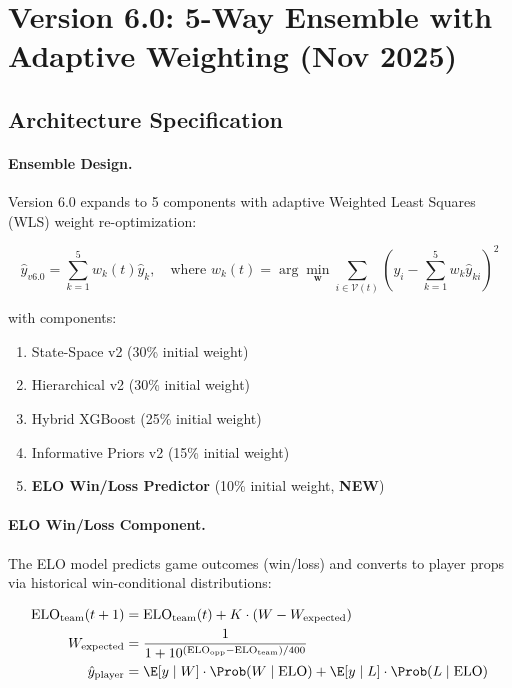 \section{Version 6.0: 5-Way Ensemble with Adaptive Weighting (Nov 2025)}
\label{sec:arch-v6}

\subsection{Architecture Specification}

\paragraph{Ensemble Design.}
Version 6.0 expands to 5 components with adaptive Weighted Least Squares (WLS) weight re-optimization:

\begin{equation}
\label{eq:v6-ensemble}
\hat{y}_{v6.0} = \sum_{k=1}^{5} w_k(t) \hat{y}_k, \quad \text{where } w_k(t) = \arg\min_{\mathbf{w}} \sum_{i \in \mathcal{V}(t)} \left( y_i - \sum_{k=1}^{5} w_k \hat{y}_{ki} \right)^2
\end{equation}

\noindent with components:
\begin{enumerate}[itemsep=2pt,parsep=0pt]
    \item State-Space v2 (30\% initial weight)
    \item Hierarchical v2 (30\% initial weight)
    \item Hybrid XGBoost (25\% initial weight)
    \item Informative Priors v2 (15\% initial weight)
    \item \textbf{ELO Win/Loss Predictor} (10\% initial weight, \textbf{NEW})
\end{enumerate}

\paragraph{ELO Win/Loss Component.}
The ELO model predicts game outcomes (win/loss) and converts to player props via historical win-conditional distributions:

\begin{equation}
\label{eq:elo-component}
\begin{aligned}
\text{ELO}_{\text{team}}(t+1) &= \text{ELO}_{\text{team}}(t) + K \cdot (W - W_{\text{expected}}) \\
W_{\text{expected}} &= \frac{1}{1 + 10^{(\text{ELO}_{\text{opp}} - \text{ELO}_{\text{team}})/400}} \\
\hat{y}_{\text{player}} &= \E[y \mid W] \cdot \Prob(W \mid \text{ELO}) + \E[y \mid L] \cdot \Prob(L \mid \text{ELO})
\end{aligned}
\end{equation}

